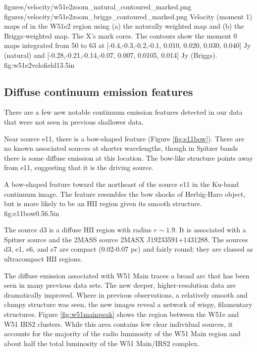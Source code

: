 \FigureTwo
{figures/velocity/w51e2zoom_natural_contoured_marked.png}
{figures/velocity/w51e2zoom_briggs_contoured_marked.png}
{Velocity (moment 1) maps of \ortho \twotwo in the W51e2 region using (a) the
naturally weighted map and (b) the Briggs-weighted map.  The X's mark
\citet{Shi2010a} cores.   
The contours show the moment 0 maps integrated from 50 to 63 \kms at
[-0.4,-0.3,-0.2,-0.1, 0.010, 0.020, 0.030, 0.040] Jy \kms (natural) and
[-0.28,-0.21,-0.14,-0.07, 0.007, 0.0105, 0.014] Jy \kms (Briggs).
}
{fig:w51e2velofield}{1}{3.5in}

\subsection{Diffuse continuum emission features}
\label{sec:diffuseemission}
There are a few new notable continuum emission features detected in our data
that were not seen in previous shallower data.

Near source e11, there is a bow-shaped feature (Figure \ref{fig:e11bow}).
There are no known associated sources at shorter wavelengths, though in Spitzer
bands there is some diffuse emission at this location.  The bow-like structure
points away from e11, suggesting that it is the driving source.

{A bow-shaped feature toward the northeast of the source e11 in the Ku-band
continuum image.  The feature resembles the bow shocks of Herbig-Haro object,
but is more likely to be an HII region given its smooth structure.}
{fig:e11bow}{0.5}{6.5in}

The source d3 is a diffuse HII region with radius $r\sim1.9$\arcsec.  It is
associated with a Spitzer source and the 2MASS source 2MASX J19233591+1431288.
The sources d3, e1, e6, and e7 are compact (0.02-0.07 pc) and fairly round;
they are classed as ultracompact HII regions.

The diffuse emission associated with W51 Main traces a broad arc that has been
seen in many previous data sets.  The new deeper, higher-resolution data are
dramatically improved.  Where in previous observations, a relatively smooth and
clumpy structure was seen, the new images reveal a network of wispy,
filamentary structures.  Figure \ref{fig:w51mainpeak} shows the region between
the W51e and W51 IRS2 clusters.  While this area contains few clear individual
sources, it accounts for the majority of the radio luminosity of the W51 Main
region and about half the total luminosity of the W51 Main/IRS2 complex.

